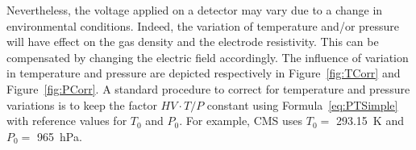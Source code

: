 	Nevertheless, the voltage applied on a detector may vary due to a change in environmental conditions. Indeed, the variation of temperature and/or pressure will have effect on the gas density and the electrode resistivity. This can be compensated by changing the electric field accordingly. The influence of variation in temperature and pressure are depicted respectively in Figure~\ref{fig:TCorr} and Figure~\ref{fig:PCorr}. A standard procedure to correct for temperature and pressure variations is to keep the factor $HV\cdot T/P$ constant using Formula~\ref{eq:PTSimple}~\cite{ABBRESCIA1995,ABBRESCIA1997PRES} with reference values for $T_0$ and $P_0$. For example, CMS uses $T_0=$ \SI{293.15}{K} and $P_0=$ \SI{965}{hPa}.
	
\endgroup
	
\begingroup\setlength{\intextsep}{10pt}\setlength{\columnsep}{10pt}
	

